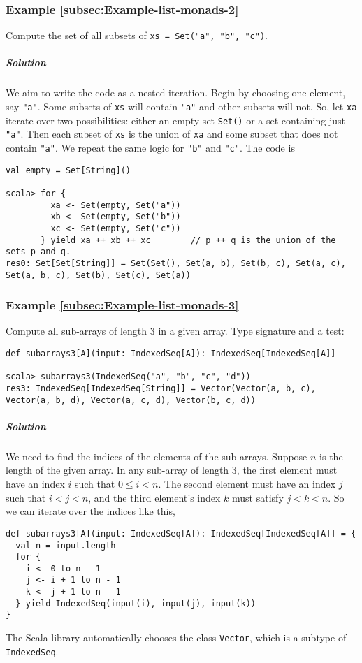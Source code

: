 \subsubsection{Example \label{subsec:Example-list-monads-2}\ref{subsec:Example-list-monads-2}}

Compute the set of all subsets of \lstinline!xs = Set("a", "b", "c")!. 

\subparagraph{Solution}

We aim to write the code as a nested iteration. Begin by choosing
one element, say \lstinline!"a"!. Some subsets of \lstinline!xs!
will contain \lstinline!"a"! and other subsets will not. So, let
\lstinline!xa! iterate over two possibilities: either an empty set
\lstinline!Set()! or a set containing just \lstinline!"a"!. Then
each subset of \lstinline!xs! is the union of \lstinline!xa! and
some subset that does not contain \lstinline!"a"!. We repeat the
same logic for \lstinline!"b"! and \lstinline!"c"!. The code is
\begin{lstlisting}
val empty = Set[String]()

scala> for {
         xa <- Set(empty, Set("a"))
         xb <- Set(empty, Set("b"))
         xc <- Set(empty, Set("c"))
       } yield xa ++ xb ++ xc        // p ++ q is the union of the sets p and q.
res0: Set[Set[String]] = Set(Set(), Set(a, b), Set(b, c), Set(a, c), Set(a, b, c), Set(b), Set(c), Set(a))
\end{lstlisting}


\subsubsection{Example \label{subsec:Example-list-monads-3}\ref{subsec:Example-list-monads-3}}

Compute all sub-arrays of length $3$ in a given array. Type signature
and a test:
\begin{lstlisting}
def subarrays3[A](input: IndexedSeq[A]): IndexedSeq[IndexedSeq[A]]

scala> subarrays3(IndexedSeq("a", "b", "c", "d"))
res3: IndexedSeq[IndexedSeq[String]] = Vector(Vector(a, b, c), Vector(a, b, d), Vector(a, c, d), Vector(b, c, d))
\end{lstlisting}


\subparagraph{Solution}

We need to find the indices of the elements of the sub-arrays. Suppose
$n$ is the length of the given array. In any sub-array of length
$3$, the first element must have an index $i$ such that $0\leq i<n$.
The second element must have an index $j$ such that $i<j<n$, and
the third element\textsf{'}s index $k$ must satisfy $j<k<n$. So we can iterate
over the indices like this,
\begin{lstlisting}
def subarrays3[A](input: IndexedSeq[A]): IndexedSeq[IndexedSeq[A]] = {
  val n = input.length
  for {
    i <- 0 to n - 1
    j <- i + 1 to n - 1
    k <- j + 1 to n - 1
  } yield IndexedSeq(input(i), input(j), input(k))
}
\end{lstlisting}
The Scala library automatically chooses the class \lstinline!Vector!,
which is a subtype of \lstinline!IndexedSeq!.


